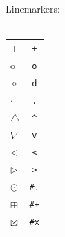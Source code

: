 \documentclass[a4paper]{article}
\begin{document}
\begin{minipage}{2cm}
  Linemarkers:\\ \\
  \begin{tabular}{l|c}
    + & \texttt{+} \\
    o & \texttt{o} \\
    $\diamond$ & \texttt{d} \\
    $\cdot$ & \texttt{.} \\
    $\triangle$ & \texttt{\^{}} \\
    $\nabla$ &\texttt{v} \\
    $\lhd$ & \texttt{<} \\
    $\rhd$ & \texttt{>} \\
    $\odot$ & \texttt{\#.} \\
    $\boxplus$ & \texttt{\#+} \\
    $\boxtimes$ & \texttt{\#x} 
  \end{tabular}
\end{minipage}
\end{document}
